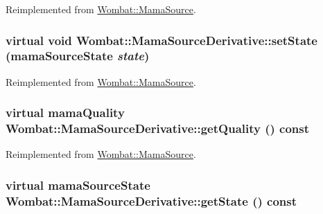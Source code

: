 Reimplemented from \hyperlink{classWombat_1_1MamaSource_afe18fd5c7376c482d212505c9258b8dd}{Wombat::MamaSource}.\hypertarget{classWombat_1_1MamaSourceDerivative_a7fece4c57902446e3a6d6c7383d0dd05}{
\subsubsection[{setState}]{\setlength{\rightskip}{0pt plus 5cm}virtual void Wombat::MamaSourceDerivative::setState (mamaSourceState {\em state})}}
\label{classWombat_1_1MamaSourceDerivative_a7fece4c57902446e3a6d6c7383d0dd05}


Reimplemented from \hyperlink{classWombat_1_1MamaSource_ac51271403c954b64180618a6b255e476}{Wombat::MamaSource}.\hypertarget{classWombat_1_1MamaSourceDerivative_a2890de3e06726484076e528175accbbf}{
\subsubsection[{getQuality}]{\setlength{\rightskip}{0pt plus 5cm}virtual mamaQuality Wombat::MamaSourceDerivative::getQuality () const}}
\label{classWombat_1_1MamaSourceDerivative_a2890de3e06726484076e528175accbbf}


Reimplemented from \hyperlink{classWombat_1_1MamaSource_a5859d625c3a226b9a4dee940504ee81e}{Wombat::MamaSource}.\hypertarget{classWombat_1_1MamaSourceDerivative_a594b539ec60c664bde5478100b39147e}{
\subsubsection[{getState}]{\setlength{\rightskip}{0pt plus 5cm}virtual mamaSourceState Wombat::MamaSourceDerivative::getState () const}}
\label{classWombat_1_1MamaSourceDerivative_a594b539ec60c664bde5478100b39147e}


